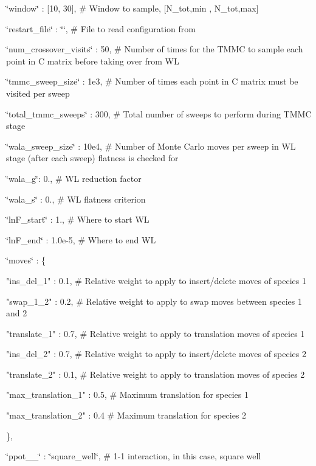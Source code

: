\char`\"{}window\char`\"{} \-: \mbox{[}10, 30\mbox{]}, \# Window to sample, \mbox{[}N\-\_\-tot,min , N\-\_\-tot,max\mbox{]}

\char`\"{}restart\-\_\-file\char`\"{} \-: \char`\"{}\char`\"{}, \# File to read configuration from

\char`\"{}num\-\_\-crossover\-\_\-visits\char`\"{} \-: 50, \# Number of times for the T\-M\-M\-C to sample each point in C matrix before taking over from W\-L

\char`\"{}tmmc\-\_\-sweep\-\_\-size\char`\"{} \-: 1e3, \# Number of times each point in C matrix must be visited per sweep

\char`\"{}total\-\_\-tmmc\-\_\-sweeps\char`\"{} \-: 300, \# Total number of sweeps to perform during T\-M\-M\-C stage

\char`\"{}wala\-\_\-sweep\-\_\-size\char`\"{} \-: 10e4, \# Number of Monte Carlo moves per sweep in W\-L stage (after each sweep) flatness is checked for

\char`\"{}wala\-\_\-g\char`\"{}\-: 0., \# W\-L reduction factor

\char`\"{}wala\-\_\-s\char`\"{} \-: 0., \# W\-L flatness criterion

\char`\"{}ln\-F\-\_\-start\char`\"{} \-: 1., \# Where to start W\-L

\char`\"{}ln\-F\-\_\-end\char`\"{} \-: 1.\-0e-\/5, \# Where to end W\-L

\char`\"{}moves\char`\"{} \-: \{ \begin{DoxyVerb}"ins_del_1" : 0.1, # Relative weight to apply to insert/delete moves of species 1

"swap_1_2" : 0.2, # Relative weight to apply to swap moves between species 1 and 2

"translate_1" : 0.7, # Relative weight to apply to translation moves of species 1

"ins_del_2" : 0.7, # Relative weight to apply to insert/delete moves of species 2

"translate_2" : 0.1, # Relative weight to apply to translation moves of species 2

"max_translation_1" : 0.5, # Maximum translation for species 1

"max_translation_2" : 0.4 # Maximum translation for species 2
\end{DoxyVerb}


\},

\char`\"{}ppot\-\_\-\_\char`\"{} \-: \char`\"{}square\-\_\-well\char`\"{}, \# 1-\/1 interaction, in this case, square well

